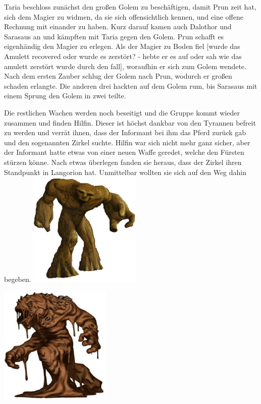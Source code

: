 \documentclass[10pt,twoside,twocolumn,openany]{book}
\begin{document}
	Taria beschloss zunächst den großen Golem zu beschäftigen, damit Prun zeit hat, sich dem Magier zu widmen, da sie sich offensichtlich kennen, und eine offene Rechnung mit einander zu haben. Kurz darauf kamen auch Dalothor und Sarasaus an und kämpften mit Taria gegen den Golem. Prun schafft es eigenhändig den Magier zu erlegen. Als der Magier zu Boden fiel [wurde das Amulett recovered oder wurde es zerstört? - hebte er es auf oder sah wie das amulett zerstört wurde durch den fall], woraufhin er sich zum Golem wendete. Nach dem ersten Zauber schlug der Golem nach Prun, wodurch er großen schaden erlangte. Die anderen drei hackten auf dem Golem rum, bis Sarasaus mit einem Sprung den Golem in zwei teilte. 
	
	Die restlichen Wachen werden noch beseitigt und die Gruppe kommt wieder zusammen und finden Hilfin. Dieser ist höchst dankbar von den Tyrannen befreit zu werden und verrät ihnen, dass der Informant bei ihm das Pferd zurück gab und den sogenannten Zirkel suchte. Hilfin war sich nicht mehr ganz sicher, aber der Informant hatte etwas von einer neuen Waffe geredet, welche den Fürsten stürzen könne. Nach etwas überlegen fanden sie heraus, dass der Zirkel ihren Standpunkt in Langorion hat. Unmittelbar wollten sie sich auf den Weg dahin begeben.
	\newpage
	\includegraphics[width=0.40\textwidth]{unbakedGolemSmall}\par\vspace*{3cm}
	
	\includegraphics[width=0.40\textwidth]{unbakedGolemBig}\par
	\newpage
	
	
	
\end{document}
